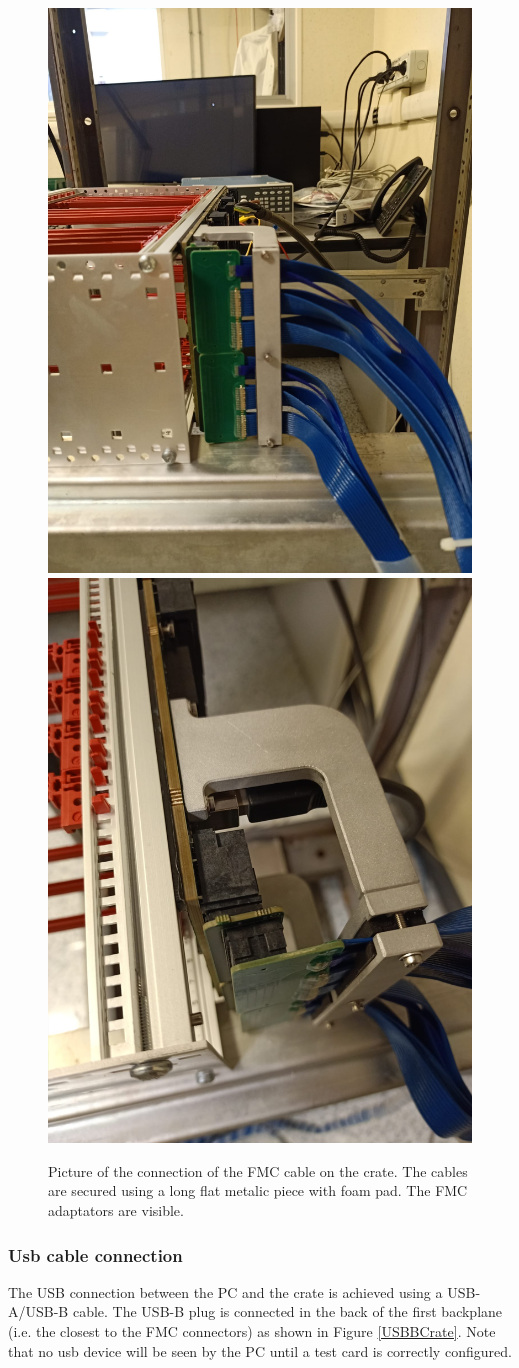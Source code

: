 \documentclass[10pt,a4paper]{article}
\begin{document}
\begin{figure}[h!]
\centering
 \includegraphics[width=0.4\linewidth]{FMC_Crate.jpeg} 
 \includegraphics[width=0.4\linewidth]{FMC_Crate1.jpeg} 
  \caption{Picture of the connection of the FMC cable on the crate. The cables are secured using a long flat metalic piece with foam pad. The FMC adaptators are visible.}
  \label{FMC_Crate}
\end{figure}

\subsubsection{Usb cable connection}
The USB connection between the PC and the crate is achieved using a USB-A/USB-B cable. The USB-B plug is connected in the back of the first backplane (i.e. the closest to the FMC connectors) as shown in Figure \ref{USBBCrate}. 
Note that no usb device will be seen by the PC until a test card is correctly configured.
\end{document}
